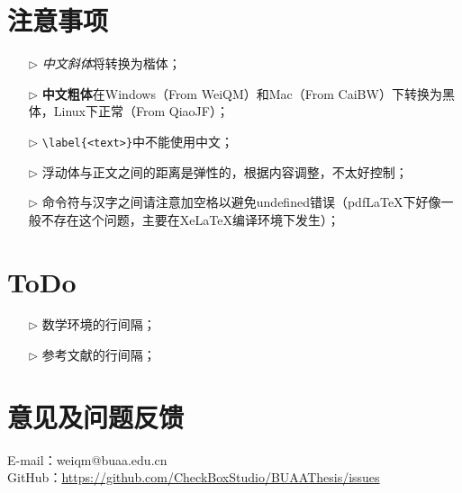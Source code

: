 \section{注意事项}
\begin{itemize}
  \item[$\triangleright$] \textit{中文斜体}将转换为楷体；
  \item[$\triangleright$] \textbf{中文粗体}在Windows（From WeiQM）和Mac（From CaiBW）下转换为黑体，Linux下正常（From QiaoJF）；
  \item[$\triangleright$] \verb|\label{<text>}|中不能使用中文；
  \item[$\triangleright$] 浮动体与正文之间的距离是弹性的，根据内容调整，不太好控制；
  \item[$\triangleright$] 命令符与汉字之间请注意加空格以避免undefined错误（pdfLaTeX下好像一般不存在这个问题，主要在XeLaTeX编译环境下发生）；
\end{itemize}

\section{ToDo}
\begin{itemize}
  \item[$\triangleright$] 数学环境的行间隔；
  \item[$\triangleright$] 参考文献的行间隔；
\end{itemize}

\section{意见及问题反馈}

\indent E-mail：weiqm@buaa.edu.cn \\
\indent GitHub：\href{https://github.com/CheckBoxStudio/BUAAThesis/issues}{https://github.com/CheckBoxStudio/BUAAThesis/issues}